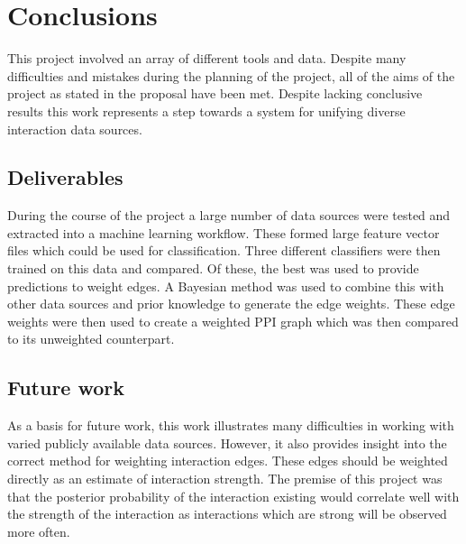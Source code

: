 \chapter{Conclusions}
\label{conclusion}

This project involved an array of different tools and data.
Despite many difficulties and mistakes during the planning of the project, all of the aims of the project as stated in the proposal have been met.
Despite lacking conclusive results this work represents a step towards a system for unifying diverse interaction data sources.


\section{Deliverables}
During the course of the project a large number of data sources were tested and extracted into a machine learning workflow.
These formed large feature vector files which could be used for classification.
Three different classifiers were then trained on this data and compared.
Of these, the best was used to provide predictions to weight edges.
A Bayesian method was used to combine this with other data sources and prior knowledge to generate the edge weights.
These edge weights were then used to create a weighted \ac{PPI} graph which was then compared to its unweighted counterpart.




\section{Future work}
As a basis for future work, this work illustrates many difficulties in working with varied publicly available data sources.
However, it also provides insight into the correct method for weighting interaction edges.
These edges should be weighted directly as an estimate of interaction strength.
The premise of this project was that the posterior probability of the interaction existing would correlate well with the strength of the interaction as interactions which are strong will be observed more often.

